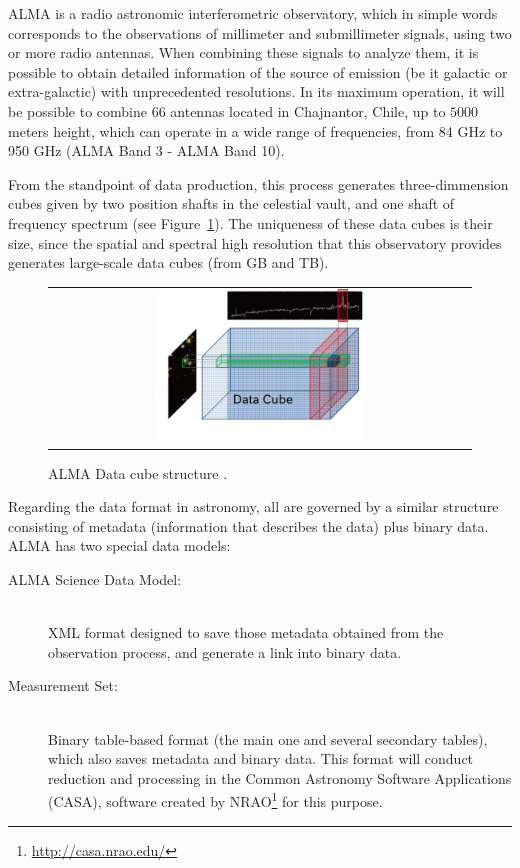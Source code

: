 \documentclass[]{spie}
\begin{document}
ALMA is a radio astronomic interferometric observatory, which in simple words
corresponds to the observations of millimeter and submillimeter signals, using
two or more radio antennas.  When combining these signals to analyze them, it is
possible to obtain detailed information of the source of emission (be it
galactic or extra-galactic) with unprecedented resolutions.  In its maximum
operation, it will be possible to combine 66 antennas located in Chajnantor,
Chile, up to $5000$ meters height, which can operate in a wide range of
frequencies, from 84 GHz to 950 GHz (ALMA Band 3 - ALMA Band 10).

From the standpoint of data production, this process generates three-dimmension
cubes given by two position shafts in the celestial vault, and one shaft of
frequency spectrum (see Figure~\ref{fig:cube}).  The uniqueness of these data
cubes is their size, since the spatial and spectral high resolution that this
observatory provides generates large-scale data cubes (from GB and TB).

\begin{figure}
   \begin{center}
   \begin{tabular}{c}
   \includegraphics[width=0.5\textwidth]{images/cube.png}
   \end{tabular}
   \end{center}
   \caption[example]
   { \label{fig:cube} ALMA Data cube structure \cite{dent20132}.}
\end{figure}


Regarding the data format in astronomy, all are governed by a similar structure
consisting of metadata (information that describes the data) plus binary data.
ALMA has two special data models:
\begin{description}
    \item[ALMA Science Data Model:] \hfill \\
        XML format designed to save those metadata obtained from the observation
        process, and generate a link into binary data.
    \item[Measurement Set:] \hfill \\
        Binary table-based format (the main one and several secondary tables),
        which also saves metadata and binary data. This format will conduct
        reduction and processing in the Common Astronomy Software Applications
        (CASA), software created by NRAO\footnote{\url{http://casa.nrao.edu/}}
        for this purpose.
\end{description}
\end{document}
